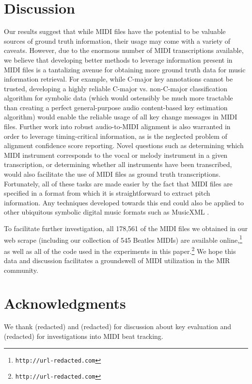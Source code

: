 \documentclass{article}
\begin{document}
\section{Discussion}
\label{sec:discussion}

Our results suggest that while MIDI files have the potential to be valuable sources of ground truth information, their usage may come with a variety of caveats.
However, due to the enormous number of MIDI transcriptions available, we believe that developing better methods to leverage information present in MIDI files is a tantalizing avenue for obtaining more ground truth data for music information retrieval.
For example, while C-major key annotations cannot be trusted, developing a highly reliable C-major vs. non-C-major classification algorithm for symbolic data (which would ostensibly be much more tractable than creating a perfect general-purpose audio content-based key estimation algorithm) would enable the reliable usage of all key change messages in MIDI files.
Further work into robust audio-to-MIDI alignment is also warranted in order to leverage timing-critical information, as is the neglected problem of alignment confidence score reporting.
Novel questions such as determining which MIDI instrument corresponds to the vocal or melody instrument in a given transcription, or determining whether all instruments have been transcribed, would also facilitate the use of MIDI files as ground truth transcriptions.
Fortunately, all of these tasks are made easier by the fact that MIDI files are specified in a format from which it is straightforward to extract pitch information.
Any techniques developed towards this end could also be applied to other ubiquitous symbolic digital music formats such as MusicXML \cite{good2001musicxml}.

To facilitate further investigation, all 178,561 of the MIDI files we obtained in our web scrape (including our collection of 545 Beatles MIDIs) are available online,\footnote{\texttt{http://url-redacted.com}} as well as all of the code used in the experiments in this paper.\footnote{\texttt{http://url-redacted.com}}
We hope this data and discussion facilitates a groundswell of MIDI utilization in the MIR community.

\section{Acknowledgments}

We thank (redacted) %
and (redacted) %
for discussion about key evaluation and (redacted) %
for investigations into MIDI beat tracking.

\small

\end{document}
